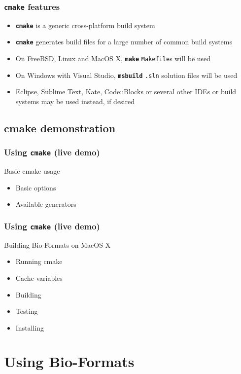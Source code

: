 \documentclass{beamer}
\newcommand{\cmd}[1]{\textbf{\texttt{#1}}}
\begin{document}
\begin{frame}
  \frametitle{\cmd{cmake} features}

  \begin{itemize}
  \item \cmd{cmake} is a generic cross-platform build system
  \item \cmd{cmake} generates build files for a large number of common
    build systems
  \item On FreeBSD, Linux and MacOS X, \cmd{make} \texttt{Makefile}s will be used
  \item On Windows with Visual Studio, \cmd{msbuild} \texttt{.sln}
    solution files will be used
  \item Eclipse, Sublime Text, Kate, Code::Blocks or several other
    IDEs or build systems may be used instead, if desired
  \end{itemize}
\end{frame}

\subsection{cmake demonstration}

\begin{frame}
  \frametitle{Using \cmd{cmake} (live demo)}
  \begin{block}{Basic cmake usage}
    \begin{itemize}
      \item Basic options
      \item Available generators
    \end{itemize}
  \end{block}
\end{frame}

\begin{frame}
  \frametitle{Using \cmd{cmake} (live demo)}
  \begin{block}{Building Bio-Formats on MacOS X}
    \begin{itemize}
      \item Running cmake
      \item Cache variables
      \item Building
      \item Testing
      \item Installing
    \end{itemize}
  \end{block}
\end{frame}

\section{Using Bio-Formats}
\end{document}

